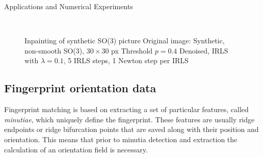 \begin{chapter}{Applications and Numerical Experiments}
\begin{figure}[h!]
    \centering
    \\
    \caption[Inpainting of synthetic SO(3) picture]{Inpainting of synthetic SO(3) picture
	 Original image: Synthetic, non-smooth SO(3), $30\times 30$ px
	 Threshold $p=0.4$
	 Denoised, IRLS with $\lambda=0.1$, 5 IRLS steps, 1 Newton step per IRLS
	\label{fig:application_so1}
    }
\end{figure}


\FloatBarrier
\subsection{Fingerprint orientation data} %
\label{sub:Fingerprint orientation data}
Fingerprint matching is  based on extracting a set of particular features, called \emph{minutiae}, which uniquely define the fingerprint.
These features are usually ridge endpoints or ridge bifurcation points that are saved along with their position and orientation. This
means that prior to minutia detection and extraction the calculation of an orientation field is necessary.\\


\end{chapter}
